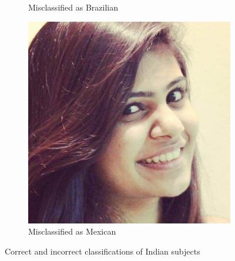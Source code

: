 \begin{figure}[!htb]
\begin{subfigure}[t]{0.3\textwidth}
      \caption{Misclassified as Brazilian}
    \end{subfigure}
    \begin{subfigure}[t]{0.3\textwidth}
      \includegraphics[width=\textwidth]{figures/results/misclassification/india-mexico.jpg}
      \caption{Misclassified as Mexican}
    \end{subfigure}
\caption{Correct and incorrect classifications of Indian subjects}
\label{fig:results:dc:misclass:india}
\end{figure}

